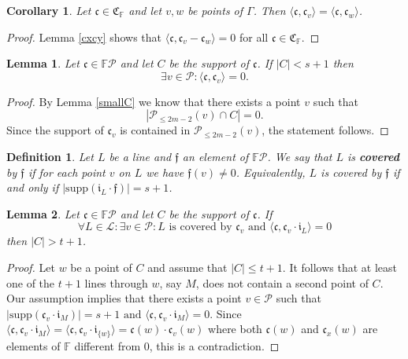 \documentclass[12pt]{article}
\newcommand{\F}{\mathbb{F}}
\newcommand{\Points}{\mathcal{P}}
\newcommand{\Lines}{\mathcal{L}}
\newcommand{\FP}{\F\Points}
\newcommand{\Code}{\mathfrak{C}_\F}
\newcommand{\f}{\mathfrak{f}}
\renewcommand{\i}{\mathfrak{i}}
\renewcommand{\c}{\mathfrak{c}}
\newcommand{\cx}{\mathfrak{c}_{x}}
\newcommand{\cv}{\mathfrak{c}_{v}}
\newtheorem{definition}{Definition}
\newtheorem{corollary}{Corollary}
\newtheorem{lemma}{Lemma}
\theoremstyle{remark}
\begin{document}
\begin{corollary} \label{AllEq}Let \(\mathfrak{c}\in \Code\) and let  \( v, w \) be points of \(\Gamma\). Then \( \langle \c, \cv \rangle = \langle \c, \c_w \rangle\).
\end{corollary}
\begin{proof}
    Lemma \ref{cxcy} shows that \( \langle \c, \cv - \c_w \rangle = 0\) for all \(\mathfrak{c}\in \Code\).
\end{proof}



\begin{lemma}\label{existsEmpty}
Let \(\c\in \FP\) and let \(C\) be the support of \(\c\).
If \(|C|<s+1\) then
\[\exists v \in \Points: \langle \c, \cv\rangle = 0.\]
\end{lemma}
\begin{proof}
	By Lemma \ref{smallC} we know that there exists a point \(v\) such that 
	\[|\Points_{\le 2m-2}(v)\cap C| = 0.\]
	Since the support of \(\cv\) is contained in \(\Points_{\le 2m-2}(v)\), the statement follows.
\end{proof}

\begin{definition}
	Let \(L\) be a line and \(\f\) an element of \(\FP\).
	We say that \(L\) is \textbf{covered} by \(\f\) if for each point \(v\) on \(L\) we have \(\f(v) \neq 0\). Equivalently, $L$ is covered by $\f$ if and only if \(|\text{supp}(\i_L\cdot\f)| = s+1\).
\end{definition}

\begin{lemma}\label{smallcx}  
	Let \(\c\in \FP\) and let \(C\) be the support of \(\c\). If
	\[\forall L \in \Lines: \exists v \in \Points: L \text{ is covered by } \cv \text{ and } \langle \c, \cv \cdot \i_L \rangle = 0\] then \(|C|> t + 1\).
\end{lemma}
\begin{proof}
	Let \(w\) be a point of \(C\) and assume that \(|C|\le t+1\).
	It follows that at least one of the \(t+1\) lines through \(w\), say $M$, does not contain a second point of \(C\). Our assumption implies that there exists a point \(v\in\Points\) such that \(|\text{supp}(\cv\cdot \i_M)| = s+1 \text{ and } \langle \c, \cv\cdot\i_M \rangle = 0 \). Since \(\langle \c, \cv\cdot\i_M \rangle = \langle \c, \cv\cdot\i_{\{w\}} \rangle = \c(w)\cdot \cv(w)\) where both \(\c(w)\) and \(\cx(w)\) are elements of \(\F\) different from \(0\), this is a contradiction.
\end{proof}
\end{document}

